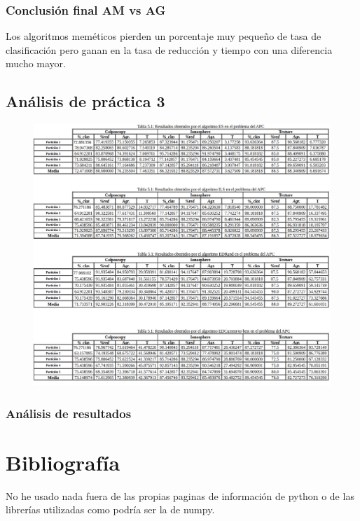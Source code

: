 \documentclass[titlepage]{article}
\begin{document}
	\subsubsection{Conclusión final AM vs AG}
	Los algoritmos meméticos pierden un porcentaje muy pequeño de tasa de clasificación pero ganan en la tasa de reducción y tiempo con una diferencia mucho mayor.
	
	\subsection{Análisis de práctica 3}
	\begin{figure}[H]
		\centering
		\includegraphics[width=1\linewidth]{screenshot013}
		\caption{}
		\label{fig:screenshot013}
	\end{figure}
	
	
	\subsubsection{Análisis de resultados}
	
	
	
	
	
	
	
	\section{Bibliografía}
	No he usado nada fuera de las propias paginas de información de python o de las librerías utilizadas como podría ser la de numpy.
	
	\
  
\end{document}

